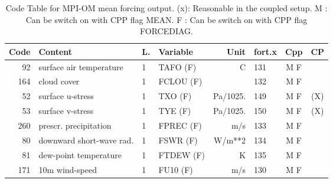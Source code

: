 \begin{table}
\begin{footnotesize}
\begin{tabular}{r|l|l|l|r|l|c|c}
Code & Content  		       & L.    &  Variable	&   Unit    &	 fort.x &  Cpp  &    CP    \\ \hline
 92  & surface air temperature         &  1    &  TAFO   (F)	&   C	    &	131	&  M F  &	   \\ 
164  & cloud cover		       &  1    &  FCLOU  (F)	&	    &	132	&  M F  &	   \\
 52  & surface u-stress 	       &  1    &  TXO	 (F)	&  Pa/1025. &	149	&  M F  &    (X)   \\
 53  & surface v-stress 	       &  1    &  TYE	 (F)	&  Pa/1025. &	150	&  M F  &    (X)   \\
260  & prescr. precipitation	       &  1    &  FPREC  (F)	&   m/s     &	133	&  M F  &	   \\
 80  & downward short-wave rad.         &  1    &  FSWR   (F)	&   W/m**2  &	134	&  M F  &	   \\
 81  & dew-point temperature	       &  1    &  FTDEW  (F)	&   K	    &	135	&  M F  &	   \\
171  & 10m wind-speed		       &  1    &  FU10   (F)	&   m/s     &	130	&  M F  &	   \\
\end{tabular}
\end{footnotesize}
\caption{Code Table for MPI-OM mean forcing output. \newline
(x): Reasonable in the coupled setup.\newline
 M : Can be switch on with CPP flag MEAN.\newline
 F : Can be switch on with CPP flag FORCEDIAG.}
\label{tb:diagnostic:output:meanforc}
\end{table}



